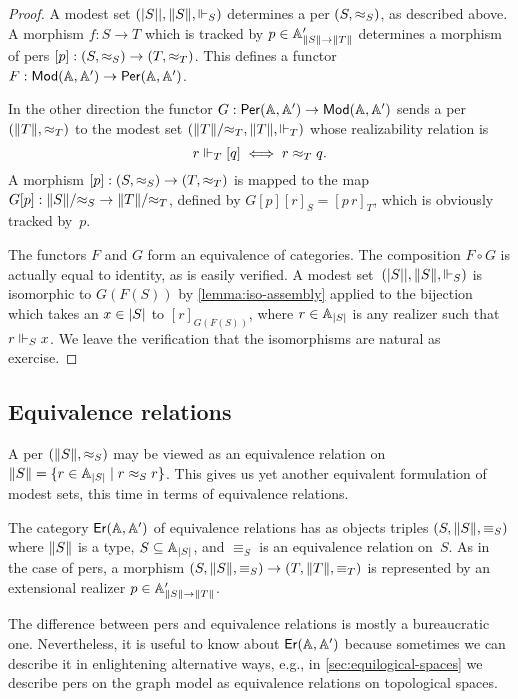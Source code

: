 \begin{proof}
  A modest set $\xasm{S}$ determines a per $(S, {\per_S})$,
  as described above. A morphism $f : S \to T$ which is tracked by $p
  \in \subAtyp{\T{S} \to \T{T}}$ determines a morphism of pers $[p] : (S,
  {\per_S}) \to (T, {\per_T})$. This defines a functor $F : \Mod{\AA,
    \subAA} \to \Per{\AA, \subAA}$.

  In the other direction the functor $G : \Per{\AA, \subAA} \to
  \Mod{\AA, \subAA}$ sends a per $(\T{T}, {\per_T})$ to the modest set
  $(\|T\|/{\per_T}, \T{T}, {\rz[T]})$ whose realizability relation is
  \begin{equation*}
    r \rz[T] [q] \iff r \per_T q.
  \end{equation*}
  A morphism $[p] : (S, {\per_S}) \to (T, {\per_T})$ is mapped to the
  map $G [p] : \|S\|/{\per_S} \to \|T\|/{\per_T}$, defined by $G [p]
  [r]_S = [p\,r]_T$, which is obviously tracked by~$p$.

  The functors $F$ and $G$ form an equivalence of categories. The
  composition $F \circ G$ is actually equal to identity, as is easily
  verified. A modest set~$\xasm{S}$ is isomorphic to
  $G(F(S))$ by \cref{lemma:iso-assembly} applied to the bijection
  which takes an $x \in \S{S}$ to $[r]_{G(F(S))}$, where $r \in \xAtyp{S}$
  is any realizer such that $r \rz[S] x$. We leave the verification
  that the isomorphisms are natural as exercise.
\end{proof}


\subsection{Equivalence relations}
\label{sec:ers}

A per $(\T{S}, {\per_S})$ may be viewed as an equivalence relation on
$\|S\| = \set{r \in \xAtyp{S} \such r \per_S r}$. This gives us yet
another equivalent formulation of modest sets, this time in terms of
equivalence relations.

The category $\Er{\AA, \subAA}$ of equivalence relations has as objects triples $(S, \T{S}, {\equiv_S})$ where $\T{S}$ is a
type, $S \subseteq \xAtyp{S}$, and $\equiv_S$ is an equivalence relation on~$S$. As in the case of pers, a morphism
$(S, \T{S}, {\equiv_S}) \to (T, \T{T}, {\equiv_T})$ is represented by an extensional realizer
$p \in \subAtyp{\T{S} \to \T{T}}$.

The difference between pers and equivalence relations is mostly a
bureaucratic one. Nevertheless, it is useful to know about $\Er{\AA,
  \subAA}$ because sometimes we can describe it in enlightening
alternative ways, e.g., in \cref{sec:equilogical-spaces} we
describe pers on the graph model as equivalence relations on
topological spaces.

